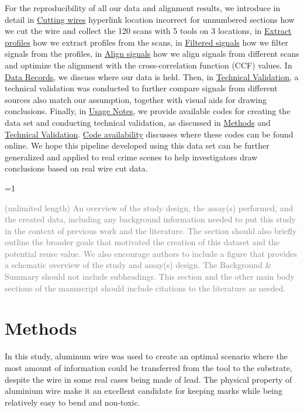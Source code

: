 \documentclass[fleqn,10pt]{wlscirep}
\newcommand{\tom}[1]{{\textcolor{RedOrange}{#1}}}
\newcommand{\ifinstruction}{0} %
\begin{document}
For the reproducibility of all our data and alignment results, we
introduce in detail in \hyperref[sec-cutting-wires]{Cutting wires}
\tom{hyperlink location incorrect for unnumbered sections} how we cut
the wire and collect the 120 scans with 5 tools on 3 locations, in
\hyperref[sec-extract-profiles]{Extract profiles} how we extract
profiles from the scans, in \hyperref[sec-filtered-signals]{Filtered
signals} how we filter signals from the profiles, in
\hyperref[sec-align-signals]{Align signals} how we align signals from
different scans and optimize the alignment with the cross-correlation
function (CCF) values. In \hyperref[sec-data-records]{Data Records}, we
discuss where our data is held. Then, in
\hyperref[sec-technical-validation]{Technical Validation}, a technical
validation was conducted to further compare signals from different
sources also match our assumption, together with visual aids for drawing
conclusions. Finally, in \hyperref[sec-usage-notes]{Usage Notes}, we
provide available codes for creating the data set and conducting
technical validation, as discussed in \hyperref[sec-methods]{Methods}
and \hyperref[sec-technical-validation]{Technical Validation}.
\hyperref[sec-code-availability]{Code availability} discusses where
these codes can be found online. We hope this pipeline developed using
this data set can be further generalized and applied to real crime
scenes to help investigators draw conclusions based on real wire cut
data.

\ifnum \ifinstruction=1

\textcolor{gray}{(unlimited length) An overview of the study design, the assay(s) performed, and the created data, including any background information needed to put this study in the context of previous work and the literature. The section should also briefly outline the broader goals that motivated the creation of this dataset and the potential reuse value. We also encourage authors to include a figure that provides a schematic overview of the study and assay(s) design. The Background \& Summary should not include subheadings. This section and the other main body sections of the manuscript should include citations to the literature as needed.}
\fi

\section*{Methods}\label{sec-methods}

In this study, aluminum wire was used to create an optimal scenario
where the most amount of information could be transferred from the tool
to the substrate, despite the wire in some real cases being made of
lead. The physical property of aluminium wire make it an excellent
candidate for keeping marks while being relatively easy to bend and
non-toxic.
\end{document}
